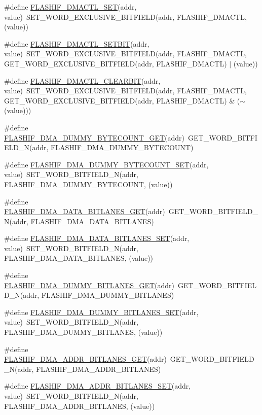 \begin{DoxyCompactItemize}
\item 
\#define \hyperlink{a00551_afa1dc119180b6e7ea20756855ac9edf1}{FLASHIF\_\-DMACTL\_\-SET}(addr, value)~SET\_\-WORD\_\-EXCLUSIVE\_\-BITFIELD(addr, FLASHIF\_\-DMACTL, (value))
\item 
\#define \hyperlink{a00551_a46b3e785b2be5c3d4f5279805bfc973f}{FLASHIF\_\-DMACTL\_\-SETBIT}(addr, value)~SET\_\-WORD\_\-EXCLUSIVE\_\-BITFIELD(addr, FLASHIF\_\-DMACTL, GET\_\-WORD\_\-EXCLUSIVE\_\-BITFIELD(addr, FLASHIF\_\-DMACTL) $|$ (value))
\item 
\#define \hyperlink{a00551_a25d26d4a4651cc6cc3d5156d0a32dede}{FLASHIF\_\-DMACTL\_\-CLEARBIT}(addr, value)~SET\_\-WORD\_\-EXCLUSIVE\_\-BITFIELD(addr, FLASHIF\_\-DMACTL, GET\_\-WORD\_\-EXCLUSIVE\_\-BITFIELD(addr, FLASHIF\_\-DMACTL) \& ($\sim$(value)))
\item 
\#define \hyperlink{a00551_aa9014f0ce7104e9c3ac0952d75ca3351}{FLASHIF\_\-DMA\_\-DUMMY\_\-BYTECOUNT\_\-GET}(addr)~GET\_\-WORD\_\-BITFIELD\_\-N(addr, FLASHIF\_\-DMA\_\-DUMMY\_\-BYTECOUNT)
\item 
\#define \hyperlink{a00551_a1af6202ed88ce9d75b2d5e34f9b34430}{FLASHIF\_\-DMA\_\-DUMMY\_\-BYTECOUNT\_\-SET}(addr, value)~SET\_\-WORD\_\-BITFIELD\_\-N(addr, FLASHIF\_\-DMA\_\-DUMMY\_\-BYTECOUNT, (value))
\item 
\#define \hyperlink{a00551_afcc1b667255973af55398c0f86f66bc2}{FLASHIF\_\-DMA\_\-DATA\_\-BITLANES\_\-GET}(addr)~GET\_\-WORD\_\-BITFIELD\_\-N(addr, FLASHIF\_\-DMA\_\-DATA\_\-BITLANES)
\item 
\#define \hyperlink{a00551_adb28a7163f051bc2219d0204bfdfb831}{FLASHIF\_\-DMA\_\-DATA\_\-BITLANES\_\-SET}(addr, value)~SET\_\-WORD\_\-BITFIELD\_\-N(addr, FLASHIF\_\-DMA\_\-DATA\_\-BITLANES, (value))
\item 
\#define \hyperlink{a00551_ab7079c7e71cefa925a9222c7145ba7de}{FLASHIF\_\-DMA\_\-DUMMY\_\-BITLANES\_\-GET}(addr)~GET\_\-WORD\_\-BITFIELD\_\-N(addr, FLASHIF\_\-DMA\_\-DUMMY\_\-BITLANES)
\item 
\#define \hyperlink{a00551_ad2a9b494534aa58a094bd5e3a23174da}{FLASHIF\_\-DMA\_\-DUMMY\_\-BITLANES\_\-SET}(addr, value)~SET\_\-WORD\_\-BITFIELD\_\-N(addr, FLASHIF\_\-DMA\_\-DUMMY\_\-BITLANES, (value))
\item 
\#define \hyperlink{a00551_a3afac59c2fb953d36afa61e6c62556ea}{FLASHIF\_\-DMA\_\-ADDR\_\-BITLANES\_\-GET}(addr)~GET\_\-WORD\_\-BITFIELD\_\-N(addr, FLASHIF\_\-DMA\_\-ADDR\_\-BITLANES)
\item 
\#define \hyperlink{a00551_a87727edc99ee5f6f7bf94268a304be37}{FLASHIF\_\-DMA\_\-ADDR\_\-BITLANES\_\-SET}(addr, value)~SET\_\-WORD\_\-BITFIELD\_\-N(addr, FLASHIF\_\-DMA\_\-ADDR\_\-BITLANES, (value))

\end{DoxyCompactItemize}
